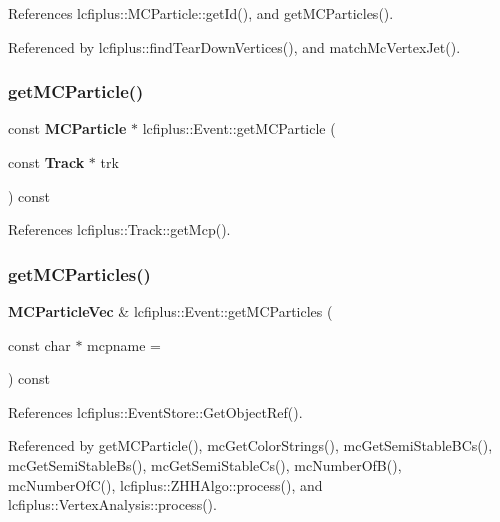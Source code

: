 References lcfiplus\+::\+M\+C\+Particle\+::get\+Id(), and get\+M\+C\+Particles().



Referenced by lcfiplus\+::find\+Tear\+Down\+Vertices(), and match\+Mc\+Vertex\+Jet().

\mbox{\label{classlcfiplus_1_1Event_ac34bb72ffd39b8c5fdbf3337749e716d}} 
\subsubsection{get\+M\+C\+Particle()\hspace{0.1cm}{\footnotesize\ttfamily [2/2]}}
{\footnotesize\ttfamily const \textbf{ M\+C\+Particle} $\ast$ lcfiplus\+::\+Event\+::get\+M\+C\+Particle (\begin{DoxyParamCaption}\item[{const \textbf{ Track} $\ast$}]{trk }\end{DoxyParamCaption}) const}



References lcfiplus\+::\+Track\+::get\+Mcp().

\mbox{\label{classlcfiplus_1_1Event_a32142d29f1b981a3a821a988e2c49535}} 
\subsubsection{get\+M\+C\+Particles()}
{\footnotesize\ttfamily \textbf{ M\+C\+Particle\+Vec} \& lcfiplus\+::\+Event\+::get\+M\+C\+Particles (\begin{DoxyParamCaption}\item[{const char $\ast$}]{mcpname = {} }\end{DoxyParamCaption}) const}



References lcfiplus\+::\+Event\+Store\+::\+Get\+Object\+Ref().



Referenced by get\+M\+C\+Particle(), mc\+Get\+Color\+Strings(), mc\+Get\+Semi\+Stable\+B\+Cs(), mc\+Get\+Semi\+Stable\+Bs(), mc\+Get\+Semi\+Stable\+Cs(), mc\+Number\+Of\+B(), mc\+Number\+Of\+C(), lcfiplus\+::\+Z\+H\+H\+Algo\+::process(), and lcfiplus\+::\+Vertex\+Analysis\+::process().

